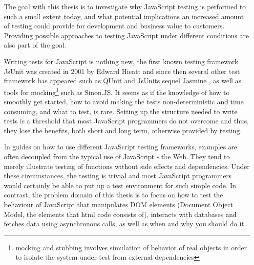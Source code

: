 \documentclass[11pt]{article}
\begin{document}
The goal with this thesis is to investigate why JavaScript testing is performed to such a small extent today, and what potential implications an increased amount of testing could provide for development and business value to customers. Providing possible approaches to testing JavaScript under different conditions are also part of the goal.

Writing tests for JavaScript is nothing new, the first known testing framework JsUnit was created in 2001 by Edward Hieatt\cite{GoingFaster,JsUnitGithub} and since then several other test framework has appeared such as QUnit \cite{QUnitSite} and JsUnits sequel Jasmine \cite{JasmineSite}, as well as tools for mocking\footnote{mocking and stubbing involves simulation of behavior of real objects in order to isolate the system under test from external dependencies} such as Sinon.JS\cite{SinonJS}. It seems as if the knowledge of how to smoothly get started, how to avoid making the tests non-deterministic and time consuming, and what to test, is rare. Setting up the structure needed to write tests is a threshold that most JavaScript programmers do not overcome\cite{TestingStatistics} and thus, they lose the benefits, both short and long term, otherwise provided by testing.

In guides on how to use different JavaScript testing frameworks, examples are often decoupled from the typical use of JavaScript - the Web. They tend to merely illustrate testing of functions without side effects and dependencies. Under these circumstances, the testing is trivial and most JavaScript programmers would certainly be able to put up a test environment for such simple code. In contrast, the problem domain of this thesis is to focus on how to test the behaviour of JavaScript that manipulates DOM elements (Document Object Model, the elements that html code consists of), interacts with databases and fetches data using asynchronous calls, as well as when and why you should do it.
\end{document}
